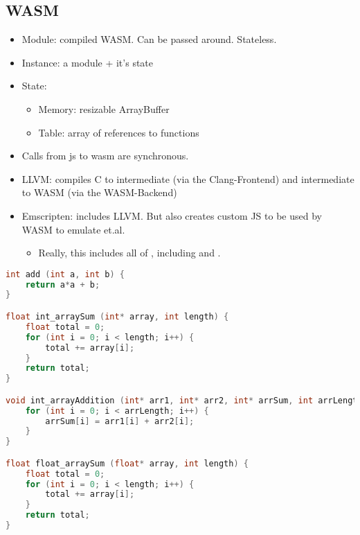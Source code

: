 {\subsection{WASM}

\begin{itemize}
    \item Module: compiled WASM. Can be passed around. Stateless.
    \item Instance: a module + it's state
    \item State: 
        \begin{itemize}
            \item Memory: resizable ArrayBuffer
            \item Table: array of references to functions
        \end{itemize}
\end{itemize}

\begin{itemize}
    \item Calls from js to wasm are synchronous.
\end{itemize}

\begin{itemize}
    \item LLVM: compiles C to intermediate (via the Clang-Frontend) and intermediate to WASM (via the WASM-Backend)
    \item Emscripten: includes LLVM. But also creates custom JS to be used by WASM to emulate  et.al.
    \begin{itemize} 
        \item Really, this includes all of , including  and .
    \end{itemize}
\end{itemize}


\begin{lstlisting}[language=c]
int add (int a, int b) {
    return a*a + b;
}

float int_arraySum (int* array, int length) {
    float total = 0; 
    for (int i = 0; i < length; i++) {
        total += array[i];
    }
    return total;
}

void int_arrayAddition (int* arr1, int* arr2, int* arrSum, int arrLength) {
    for (int i = 0; i < arrLength; i++) {
        arrSum[i] = arr1[i] + arr2[i];
    }
}

float float_arraySum (float* array, int length) {
    float total = 0; 
    for (int i = 0; i < length; i++) {
        total += array[i];
    }
    return total;
}


\end{lstlisting}}
